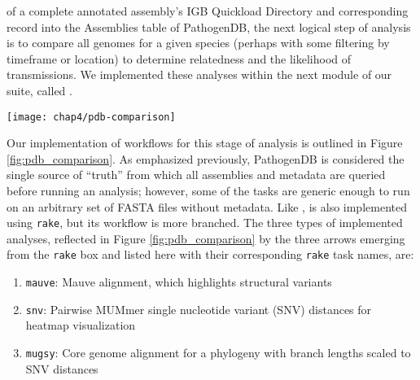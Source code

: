  of a complete annotated assembly's IGB Quickload Directory and corresponding record into the Assemblies table of PathogenDB, the next logical step of analysis is to compare all genomes for a given species (perhaps with some filtering by timeframe or location) to determine relatedness and the likelihood of transmissions. We implemented these analyses within the next module of our suite, called \pathogendbcomparison.

\begin{figure*}[htb]
  \centering
  \texttt{[image: chap4/pdb-comparison]}               
  \caption[Outline of steps automated by \pathogendbcomparison]{\textbf{Outline of steps automated by \pathogendbcomparison.} Processes are depicted as boxes, with processes requiring potentially multiple runs indicated as a ``stack.'' An interim file format is depicted as a single arrow, and groups of files as doubled arrows. The pipeline concludes with various outputs being sent to \pathogendbviz{} for further visualization.}
  \label{fig:pdb_comparison}
\end{figure*}

Our implementation of workflows for this stage of analysis is outlined in Figure \ref{fig:pdb_comparison}. As emphasized previously, PathogenDB is considered the single source of ``truth'' from which all assemblies and metadata are queried before running an analysis; however, some of the tasks are generic enough to run on an arbitrary set of FASTA files without metadata. Like \pathogendbpipeline, \pathogendbcomparison{} is also implemented using \texttt{rake}, but its workflow is more branched. The three types of implemented analyses, reflected in Figure \ref{fig:pdb_comparison} by the three arrows emerging from the \texttt{rake} box and listed here with their corresponding \texttt{rake} task names, are:

\begin{enumerate}[label=\arabic*.,noitemsep,labelindent=2em,leftmargin=!]
\item \verb|mauve|: Mauve alignment, which highlights structural variants
\item \verb|snv|: Pairwise MUMmer single nucleotide variant (SNV) distances for heatmap visualization
\item \verb|mugsy|: Core genome alignment for a phylogeny with branch lengths scaled to SNV distances
\end{enumerate}

